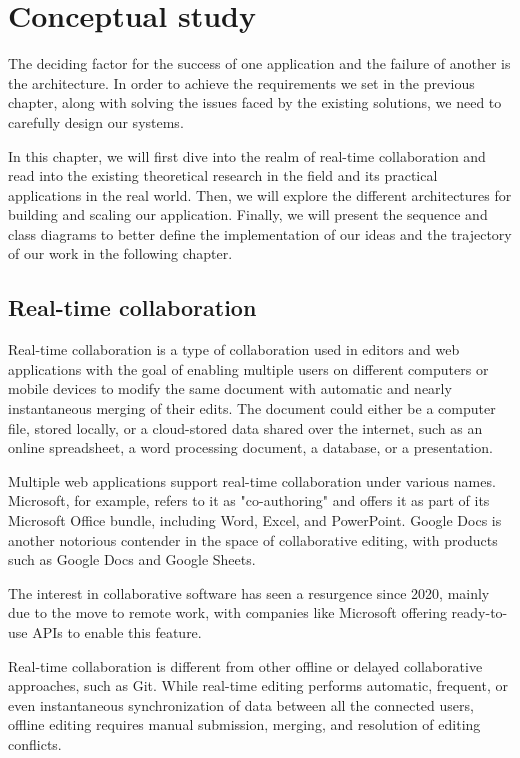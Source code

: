 \chapter{Conceptual study}
\label{chap:conceptual}

The deciding factor for the success of one application and the failure of another is the architecture.
In order to achieve the requirements we set in the previous chapter, along with solving the issues faced by the existing solutions, we need to carefully design our systems.

In this chapter, we will first dive into the realm of real-time collaboration and read into the existing theoretical research in the field and its practical applications in the real world.
Then, we will explore the different architectures for building and scaling our application. Finally, we will present the sequence and class diagrams to better define the implementation of our ideas and the trajectory of our work in the following chapter.

\section{Real-time collaboration}

Real-time collaboration is a type of collaboration used in editors and web applications with the goal of enabling multiple users on different computers or mobile devices to modify the same document with automatic and nearly instantaneous merging of their edits.
The document could either be a computer file, stored locally, or a cloud-stored data shared over the internet, such as an online spreadsheet, a word processing document, a database, or a presentation.

Multiple web applications support real-time collaboration under various names.
Microsoft, for example, refers to it as "co-authoring" and offers it as part of its Microsoft Office bundle, including Word, Excel, and PowerPoint. \cite{noauthor_document_nodate}
Google Docs is another notorious contender in the space of collaborative editing, with products such as Google Docs and Google Sheets.

The interest in collaborative software has seen a resurgence since 2020, mainly due to the move to remote work, with companies like Microsoft offering ready-to-use APIs to enable this feature.

Real-time collaboration is different from other offline or delayed collaborative approaches, such as Git.
While real-time editing performs automatic, frequent, or even instantaneous synchronization of data between all the connected users, offline editing requires manual submission, merging, and resolution of editing conflicts.

